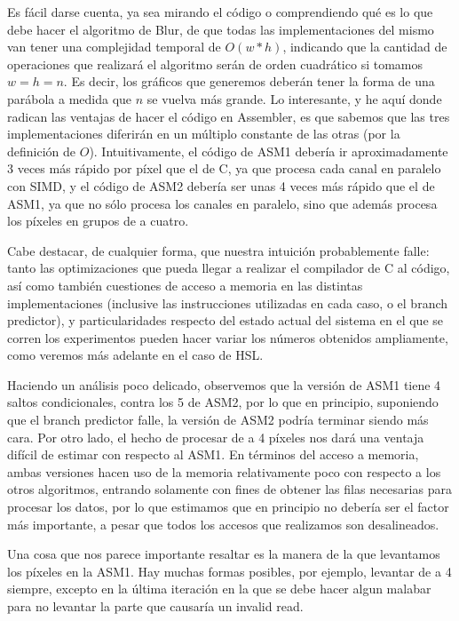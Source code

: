Es fácil darse cuenta, ya sea mirando el código o comprendiendo qué es lo que debe hacer el algoritmo de Blur, de que todas las implementaciones del mismo van tener una complejidad temporal de $O(w*h)$, indicando que la cantidad de operaciones que realizará el algoritmo serán de orden cuadrático si tomamos $w = h = n$. Es decir, los gráficos que generemos deberán tener la forma de una parábola a medida que $n$ se vuelva más grande. Lo interesante, y he aquí donde radican las ventajas de hacer el código en Assembler, es que sabemos que las tres implementaciones diferirán en un múltiplo constante de las otras (por la definición de $O$). Intuitivamente, el código de ASM1 debería ir aproximadamente 3 veces más rápido por píxel que el de C, ya que procesa cada canal en paralelo con SIMD, y el código de ASM2 debería ser unas 4 veces más rápido que el de ASM1, ya que no sólo procesa los canales en paralelo, sino que además procesa los píxeles en grupos de a cuatro.

Cabe destacar, de cualquier forma, que nuestra intuición probablemente falle: tanto las optimizaciones que pueda llegar a realizar el compilador de C al código, así como también cuestiones de acceso a memoria en las distintas implementaciones (inclusive las instrucciones utilizadas en cada caso, o el branch predictor), y particularidades respecto del estado actual del sistema en el que se corren los experimentos pueden hacer variar los números obtenidos ampliamente, como veremos más adelante en el caso de HSL.

Haciendo un análisis poco delicado, observemos que la versión de ASM1 tiene 4 saltos condicionales, contra los 5 de ASM2, por lo que en principio, suponiendo que el branch predictor falle, la versión de ASM2 podría terminar siendo más cara. Por otro lado, el hecho de procesar de a 4 píxeles nos dará una ventaja difícil de estimar con respecto al ASM1. En términos del acceso a memoria, ambas versiones hacen uso de la memoria relativamente poco con respecto a los otros algoritmos, entrando solamente con fines de obtener las filas necesarias para procesar los datos, por lo que estimamos que en principio no debería ser el factor más importante, a pesar que todos los accesos que realizamos son desalineados.

Una cosa que nos parece importante resaltar es la manera de la que levantamos los píxeles en la ASM1. Hay muchas formas posibles, por ejemplo, levantar de a 4 siempre, excepto en la última iteración en la que se debe hacer algun malabar para no levantar la parte que causaría un invalid read.

